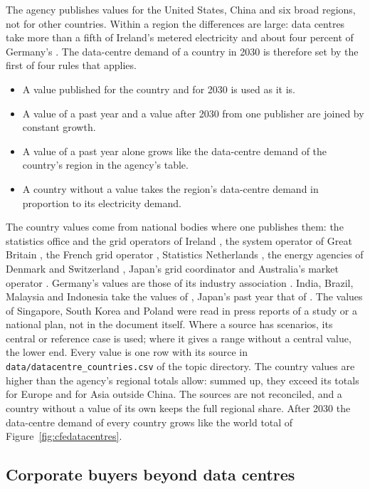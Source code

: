 The agency publishes values for the United States, China and six broad regions, not for other countries.
Within a region the differences are large: data centres take more than a fifth of Ireland's metered electricity \citep{csoireland2026} and about four percent of Germany's \citep{bitkom2024}.
The data-centre demand of a country in 2030 is therefore set by the first of four rules that applies.
\begin{itemize}[nosep,leftmargin=*]
  \item A value published for the country and for 2030 is used as it is.
  \item A value of a past year and a value after 2030 from one publisher are joined by constant growth.
  \item A value of a past year alone grows like the data-centre demand of the country's region in the agency's table.
  \item A country without a value takes the region's data-centre demand in proportion to its electricity demand.
\end{itemize}
The country values come from national bodies where one publishes them: the statistics office and the grid operators of Ireland \citep{csoireland2026,eirgrid2026}, the system operator of Great Britain \citep{neso2025}, the French grid operator \citep{rte2025}, Statistics Netherlands \citep{cbs2025}, the energy agencies of Denmark and Switzerland \citep{ens2025,bfe2026}, Japan's grid coordinator \citep{occto2026} and Australia's market operator \citep{aemo2026}.
Germany's values are those of its industry association \citep{bitkom2024}.
India, Brazil, Malaysia and Indonesia take the values of \citet{bnefdatacentres2026}, Japan's past year that of \citet{woodmacjapan2025}.
The values of Singapore, South Korea and Poland were read in press reports of a study or a national plan, not in the document itself.
Where a source has scenarios, its central or reference case is used; where it gives a range without a central value, the lower end.
Every value is one row with its source in \texttt{data/\allowbreak datacentre\_countries.csv} of the topic directory.
The country values are higher than the agency's regional totals allow: summed up, they exceed its totals for Europe and for Asia outside China.
The sources are not reconciled, and a country without a value of its own keeps the full regional share.
After 2030 the data-centre demand of every country grows like the world total of Figure~\ref{fig:cfedatacentres}.

\subsection{Corporate buyers beyond data centres}\label{sec:cfe-re100}

